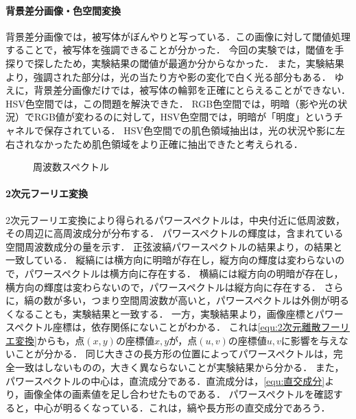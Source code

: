 \paragraph{背景差分画像・色空間変換}
背景差分画像では，被写体がぼんやりと写っている．この画像に対して閾値処理することで，被写体を強調できることが分かった．
今回の実験では，閾値を手探りで探したため，実験結果の閾値が最適か分からなかった．
また，実験結果より，強調された部分は，光の当たり方や影の変化で白く光る部分もある．
ゆえに，背景差分画像だけでは，被写体の輪郭を正確にとらえることができない．
HSV色空間では，この問題を解決できた．
RGB色空間では，明暗（影や光の状況）でRGB値が変わるのに対して，HSV色空間では，明暗が「明度」というチャネルで保存されている．
HSV色空間での肌色領域抽出は，光の状況や影に左右されなかったため肌色領域をより正確に抽出できたと考えられる．
\begin{wrapfigure}{r}[0mm]{.3\textwidth}
    \centering
    \caption{周波数スペクトル}
    \label{fig:周波数スペクトル}
    \vspace{-.5cm}
\end{wrapfigure}
\paragraph{2次元フーリエ変換}
2次元フーリエ変換により得られるパワースペクトルは，中央付近に低周波数，その周辺に高周波成分が分布する．
パワースペクトルの輝度は，含まれている空間周波数成分の量を示す．
正弦波縞パワースペクトルの結果より，の結果と一致している．
縦縞には横方向に明暗が存在し，縦方向の輝度は変わらないので，パワースペクトルは横方向に存在する．
横縞には縦方向の明暗が存在し，横方向の輝度は変わらないので，パワースペクトルは縦方向に存在する．
さらに，縞の数が多い，つまり空間周波数が高いと，パワースペクトルは外側が明るくなることも，実験結果と一致する．
一方，実験結果より，画像座標とパワースペクトル座標は，依存関係にないことがわかる．
これは\eqref{equ:2次元離散フーリエ変換}からも，点\((x,y)\)の座標値\(x,y\)が，点\((u,v)\)の座標値\(u,v\)に影響を与えないことが分かる．
同じ大きさの長方形の位置によってパワースペクトルは，完全一致はしないものの，大きく異ならないことが実験結果から分かる．
また，パワースペクトルの中心は，直流成分である．直流成分は，\eqref{equ:直交成分}より，画像全体の画素値を足し合わせたものである．
パワースペクトルを確認すると，中心が明るくなっている．これは，縞や長方形の直交成分であろう．
